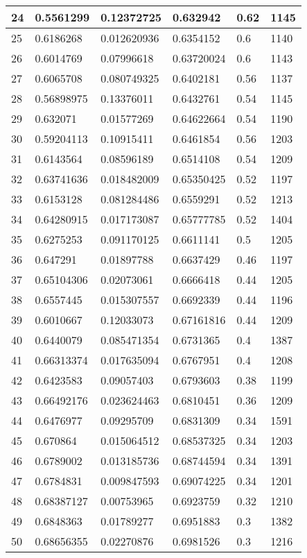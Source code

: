 \begin{longtable}{|l|l|l|l|l|l|}
24 & 0.5561299 & 0.12372725 & 0.632942 & 0.62 & 1145 \\ \hline 
25 & 0.6186268 & 0.012620936 & 0.6354152 & 0.6 & 1140 \\ \hline 
26 & 0.6014769 & 0.07996618 & 0.63720024 & 0.6 & 1143 \\ \hline 
27 & 0.6065708 & 0.080749325 & 0.6402181 & 0.56 & 1137 \\ \hline 
28 & 0.56898975 & 0.13376011 & 0.6432761 & 0.54 & 1145 \\ \hline 
29 & 0.632071 & 0.01577269 & 0.64622664 & 0.54 & 1190 \\ \hline 
30 & 0.59204113 & 0.10915411 & 0.6461854 & 0.56 & 1203 \\ \hline 
31 & 0.6143564 & 0.08596189 & 0.6514108 & 0.54 & 1209 \\ \hline 
32 & 0.63741636 & 0.018482009 & 0.65350425 & 0.52 & 1197 \\ \hline 
33 & 0.6153128 & 0.081284486 & 0.6559291 & 0.52 & 1213 \\ \hline 
34 & 0.64280915 & 0.017173087 & 0.65777785 & 0.52 & 1404 \\ \hline 
35 & 0.6275253 & 0.091170125 & 0.6611141 & 0.5 & 1205 \\ \hline 
36 & 0.647291 & 0.01897788 & 0.6637429 & 0.46 & 1197 \\ \hline 
37 & 0.65104306 & 0.02073061 & 0.6666418 & 0.44 & 1205 \\ \hline 
38 & 0.6557445 & 0.015307557 & 0.6692339 & 0.44 & 1196 \\ \hline 
39 & 0.6010667 & 0.12033073 & 0.67161816 & 0.44 & 1209 \\ \hline 
40 & 0.6440079 & 0.085471354 & 0.6731365 & 0.4 & 1387 \\ \hline 
41 & 0.66313374 & 0.017635094 & 0.6767951 & 0.4 & 1208 \\ \hline 
42 & 0.6423583 & 0.09057403 & 0.6793603 & 0.38 & 1199 \\ \hline 
43 & 0.66492176 & 0.023624463 & 0.6810451 & 0.36 & 1209 \\ \hline 
44 & 0.6476977 & 0.09295709 & 0.6831309 & 0.34 & 1591 \\ \hline 
45 & 0.670864 & 0.015064512 & 0.68537325 & 0.34 & 1203 \\ \hline 
46 & 0.6789002 & 0.013185736 & 0.68744594 & 0.34 & 1391 \\ \hline 
47 & 0.6784831 & 0.009847593 & 0.69074225 & 0.34 & 1201 \\ \hline 
48 & 0.68387127 & 0.00753965 & 0.6923759 & 0.32 & 1210 \\ \hline 
49 & 0.6848363 & 0.01789277 & 0.6951883 & 0.3 & 1382 \\ \hline 
50 & 0.68656355 & 0.02270876 & 0.6981526 & 0.3 & 1216 \\ \hline 
\end{longtable}